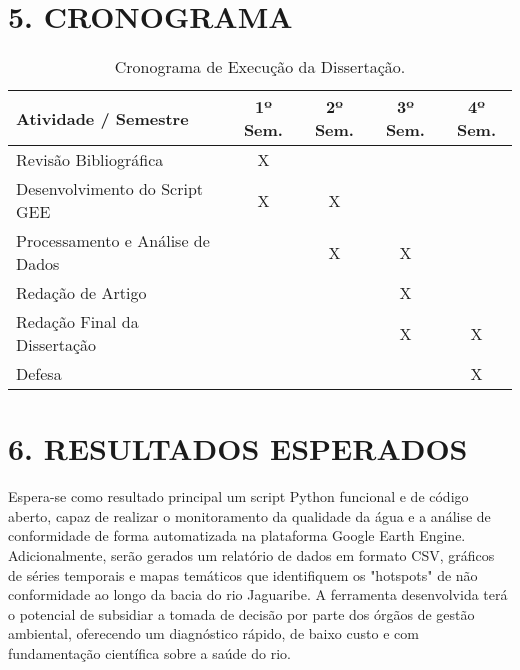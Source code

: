 \documentclass[12pt, a4paper]{article}
\begin{document}
\section*{5. CRONOGRAMA}
\begin{table}[h!]
\centering
\caption{Cronograma de Execução da Dissertação.}
\label{tab:cronograma}
\begin{tabular}{lcccc}
\toprule
\textbf{Atividade / Semestre} & \textbf{1º Sem.} & \textbf{2º Sem.} & \textbf{3º Sem.} & \textbf{4º Sem.} \\ 
\midrule
Revisão Bibliográfica & X & & & \\
Desenvolvimento do Script GEE & X & X & & \\
Processamento e Análise de Dados & & X & X & \\
Redação de Artigo & & & X & \\
Redação Final da Dissertação & & & X & X \\
Defesa & & & & X \\
\bottomrule
\end{tabular}
\end{table}

\section*{6. RESULTADOS ESPERADOS}
Espera-se como resultado principal um script Python funcional e de código aberto, capaz de realizar o monitoramento da qualidade da água e a análise de conformidade de forma automatizada na plataforma Google Earth Engine. Adicionalmente, serão gerados um relatório de dados em formato CSV, gráficos de séries temporais e mapas temáticos que identifiquem os "hotspots" de não conformidade ao longo da bacia do rio Jaguaribe. A ferramenta desenvolvida terá o potencial de subsidiar a tomada de decisão por parte dos órgãos de gestão ambiental, oferecendo um diagnóstico rápido, de baixo custo e com fundamentação científica sobre a saúde do rio.

\newpage


\end{document}
